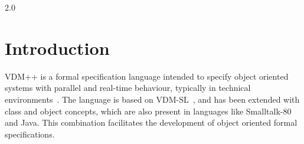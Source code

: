 \documentclass[\pformat,12pt]{article}
\newcommand{\vdmsl}{VDM-SL}
\newcommand{\vdmpp}{VDM++}
\begin{document}

        {2.0}


\newcommand{\Lit}[1]{`{\tt #1}\Quote}
\newcommand{\Rule}[2]{
  \begin{quote}\begin{tabbing}
    #1\index{#1}\ \ \= = \ \ \= #2  ; %
    
  \end{tabbing}\end{quote}
  }
\newcommand{\SeqPt}[1]{\{\ #1\ \}}
\newcommand{\lfeed}{\\ \> \>}
\newcommand{\dsepl}{\ $|$\ }
\newcommand{\dsep}{\\ \> $|$ \>}
\newcommand{\Lop}[1]{`{\sf #1}\Quote}
\newcommand{\blankline}{\vspace{\baselineskip}}
\newcommand{\Brack}[1]{(\ #1\ )}
\newcommand{\nmk}{\footnotemark}
\newcommand{\ntext}[1]{\footnotetext{{\bf Note: } #1}}
\newlength{\kwlen}
\newcommand{\Keyw}[1]{\settowidth{\kwlen}{\tt #1}\makebox[\kwlen][l]{\sf
    #1}}
\newcommand{\keyw}[1]{{\sf #1}}
\newcommand{\id}[1]{{\tt #1}}
\newcommand{\metaiv}[1]{\begin{alltt}\end{alltt}}

\newcommand{\OptPt}[1]{[\ #1\ ]}
\newcommand{\MAP}[2]{\kw{map }#1\kw{ to }#2}
\newcommand{\INMAP}[2]{\kw{inmap }#1\kw{ to }#2}
\newcommand{\SEQ}[1]{\kw{seq of }#1}
\newcommand{\NSEQ}[1]{\kw{seq1 of }#1}
\newcommand{\SET}[1]{\kw{set of }#1}
\newcommand{\PROD}[2]{#1 * #2}
\newcommand{\TO}[2]{$#1 \To #2$}
\newcommand{\FUN}[2]{#1 \To #2}
\newcommand{\PUBLIC}{\ifthenelse{\boolean{VDMpp}}{public\mbox{}}{\mbox{}}}
\newcommand{\PRIVATE}{\ifthenelse{\boolean{VDMpp}}{private}{\mbox{}}}
\newcommand{\PROTECTED}{\ifthenelse{\boolean{VDMpp}}{protected}{\mbox{}}}




\section{Introduction}


{\vdmpp} is a formal specification language intended to specify
object oriented systems with parallel 
and real-time 
behaviour,
typically in technical environments~\cite{Fitzgerald&05}.  The language is based on
\vdmsl~\cite{ISOVDM96}, and has been extended with class and object
concepts, which are also present in languages like Smalltalk-80 and
Java.  This combination facilitates the development of object oriented
formal specifications.  
\end{document}
